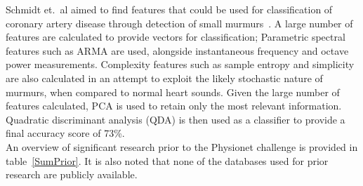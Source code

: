 \documentclass[titlepage, 12pt]{scrartcl} \usepackage{enumitem}
\begin{document}
Schmidt et.\ al aimed to find features that could be used for classification of
coronary artery disease through detection of small
murmurs~\parencite{Schmidt2015}. A large number of features are
calculated to provide vectors for classification; Parametric spectral features
such as ARMA are used, alongside instantaneous frequency and octave power
measurements. Complexity features such as sample entropy and simplicity are
also calculated in an attempt to exploit the likely stochastic nature of
murmurs, when compared to normal heart sounds.  Given the large number of
features calculated, PCA is used to retain only the most relevant information.
Quadratic discriminant analysis (QDA) is then used as a classifier to provide a
final accuracy score of 73\%.\\

An overview of significant research prior to the Physionet challenge is
provided in table~\ref{SumPrior}. It is also noted that none of the databases
used for prior research are publicly available.
\end{document}
